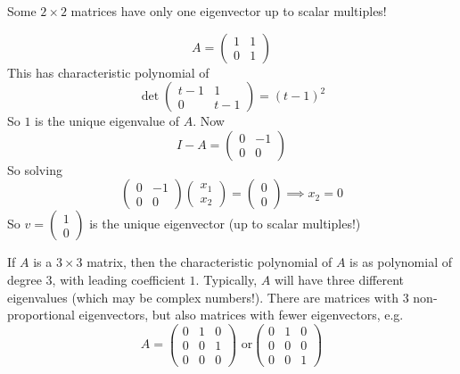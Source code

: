 \documentclass[10pt]{scrartcl}
\begin{document}
\begin{warning}
Some $2 \times 2$ matrices have only one eigenvector up to scalar multiples!	
\end{warning}\vsp

\begin{example}
\[
  A = \begin{pmatrix}
 1 & 1 \\ 0 & 1	
 \end{pmatrix}
\]
This has characteristic polynomial of 
\[
  \det\begin{pmatrix}
t-1 & 1 \\ 0 & t-1	
\end{pmatrix} = (t-1)^2
\]
So $1$ is the unique eigenvalue of $A$. Now
\[
  I - A = \begin{pmatrix}
 0 & -1 \\ 0 & 0	
 \end{pmatrix}
\]
So solving
\[
  \begin{pmatrix}
  0 & -1 \\ 0 & 0	
  \end{pmatrix}\begin{pmatrix}
x_1 \\ x_2	
\end{pmatrix} = \begin{pmatrix}
 0 \\ 0
 \end{pmatrix} \implies x_2 = 0
\]
So $v = \begin{pmatrix}
 1\\ 0	
 \end{pmatrix}$ is the unique eigenvector (up to scalar multiples!)
\end{example}\vsp

If $A$ is a $3\times 3$ matrix, then the characteristic polynomial of $A$ is as polynomial of degree $3$, with leading coefficient $1$. Typically, $A$ will have three different eigenvalues (which may be complex numbers!). There are matrices with $3$ non-proportional eigenvectors, but also matrices with fewer eigenvectors, e.g. 
\[
  A = \begin{pmatrix}
 0 & 1 & 0\\ 0 & 0 & 1\\ 0 & 0 & 0	
 \end{pmatrix} \text{ or} 
 \begin{pmatrix}
 0 & 1 & 0 \\ 0 & 0 & 0 \\ 0 & 0 &1	
 \end{pmatrix}
\]
\end{document}
